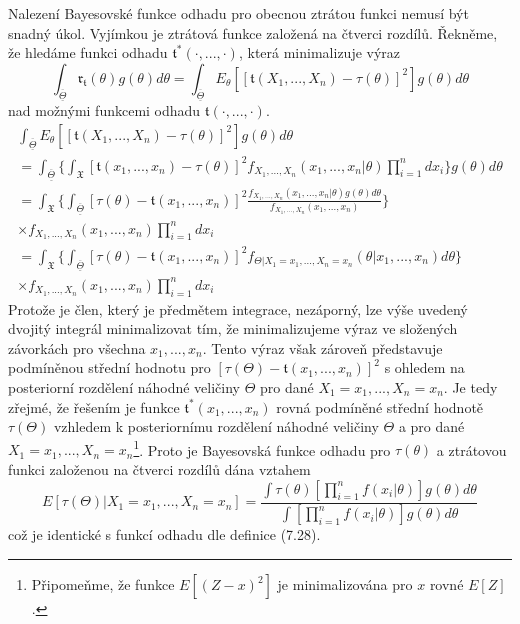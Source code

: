 Nalezení Bayesovské funkce odhadu pro obecnou ztrátou funkci nemusí být snadný úkol. Vyjímkou je ztrátová funkce založená na čtverci rozdílů. Řekněme, že hledáme funkci odhadu $\mathfrak{t}^*(\cdot, ..., \cdot)$, která minimalizuje výraz
\begin{equation*}
\int_{\overline{\underline{\Theta}}} \mathfrak{r}_{\mathfrak{t}}(\theta)g(\theta)d \theta = \int_{\overline{\underline{\Theta}}}E_{\theta}[[\mathfrak{t}(X_1, ..., X_n) - \tau(\theta)]^2]g(\theta)d \theta
\end{equation*}
nad možnými funkcemi odhadu $\mathfrak{t}(\cdot, ..., \cdot)$.
\begin{gather*}
\int_{\overline{\underline{\Theta}}}E_{\theta}[[\mathfrak{t}(X_1, ..., X_n) - \tau(\theta)]^2]g(\theta)d \theta\\
= \int_{\overline{\underline{\Theta}}}\Big\{\int_{\mathfrak{X}}[\mathfrak{t}(x_1, ..., x_n) - \tau(\theta)]^2 f_{X_1, ..., X_n}(x_1, ..., x_n| \theta)\prod_{i = 1}^n d x_i \Big\} g(\theta)d \theta\\
= \int_{\mathfrak{X}}\Big\{\int_{\overline{\underline{\Theta}}}[\tau(\theta) - \mathfrak{t}(x_1, ..., x_n)]^2 \frac{f_{X_1, ..., X_n}(x_1, ..., x_n|\theta)g(\theta)d\theta}{f_{X_1, ..., X_n}(x_1, ..., x_n)}\Big\}\\
\times f_{X_1, ..., X_n}(x_1, ..., x_n)\prod_{i = 1}^n dx_i\\
= \int_{\mathfrak{X}}\Big\{\int_{\overline{\underline{\Theta}}}[\tau(\theta) - \mathfrak{t}(x_1, ..., x_n)]^2 f_{\Theta|X_1 = x_1, ..., X_n = x_n}(\theta|x_1, ..., x_n) d \theta \Big\}\\
\times f_{X_1, ..., X_n}(x_1, ..., x_n)\prod_{i = 1}^n dx_i
\end{gather*}
Protože je člen, který je předmětem integrace, nezáporný, lze výše uvedený dvojitý integrál minimalizovat tím, že minimalizujeme výraz ve složených závorkách pro všechna $x_1, ..., x_n$. Tento výraz však zároveň představuje podmíněnou střední hodnotu pro $[\tau(\Theta) - \mathfrak{t}(x_1, ..., x_n)]^2$ s ohledem na posteriorní rozdělení náhodné veličiny $\Theta$ pro dané $X_1 = x_1, ..., X_n = x_n$. Je tedy zřejmé, že řešením je funkce $\mathfrak{t}^*(x_1, ..., x_n)$ rovná podmíněné střední hodnotě $\tau(\Theta)$ vzhledem k posteriornímu rozdělení náhodné veličiny $\Theta$ a pro dané $X_1 = x_1, ..., X_n = x_n$\footnote{Připomeňme, že funkce $E[(Z - x)^2]$ je minimalizována pro $x$ rovné $E[Z]$.}. Proto je Bayesovská funkce odhadu pro $\tau(\theta)$ a ztrátovou funkci založenou na čtverci rozdílů dána vztahem
\begin{equation*}
E[\tau(\Theta)|X_1 = x_1, ..., X_n = x_n] = \frac{\int \tau(\theta)\left[\prod_{i = 1}^n f(x_i|\theta)\right]g(\theta)d \theta}{\int \left[\prod_{i = 1}^n f(x_i|\theta)\right]g(\theta)d \theta}
\end{equation*}
což je identické s funkcí odhadu dle definice (7.28).

